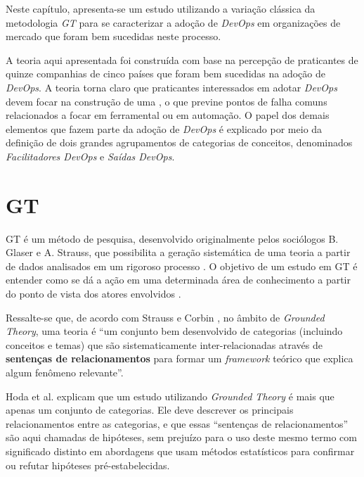 Neste capítulo, apresenta-se um estudo utilizando a variação clássica da
metodologia \textit{\acrfull{GT}} \cite{glaser1967discovery} para se
caracterizar a adoção de \textit{DevOps} em organizações de mercado que foram bem
sucedidas neste processo.

A teoria aqui apresentada foi construída com base na percepção de
praticantes de quinze companhias de cinco países que foram bem sucedidas na
adoção de \textit{DevOps}. A teoria torna claro que praticantes interessados em
adotar \textit{DevOps} devem focar na construção de uma , o que previne pontos de falha comuns relacionados a focar em
ferramental ou em automação. O papel dos demais elementos que fazem parte da
adoção de \textit{DevOps} é explicado por meio da definição de dois grandes
agrupamentos de categorias de conceitos, denominados \emph{Facilitadores DevOps}
e \emph{Saídas DevOps}.

\section{\acrfull{GT}}

\acrfull{GT} é um método de pesquisa, desenvolvido originalmente pelos
sociólogos B. Glaser e A. Strauss, que possibilita a geração sistemática de
uma teoria a partir de dados analisados em um rigoroso processo \cite{glaser1967discovery}.
O objetivo de um estudo em \acrshort{GT} é entender como se dá a ação em uma
determinada área de conhecimento a partir do ponto de vista dos atores
envolvidos \cite{glaser_doing_1998}.

Ressalte-se que, de acordo com Strauss e Corbin \cite{corbin2014basics}, no
âmbito de \textit{Grounded Theory}, uma teoria é ``um conjunto bem desenvolvido
de categorias (incluindo conceitos e temas) que são sistematicamente
inter-relacionadas através de \textbf{sentenças de relacionamentos} para
formar um \textit{framework} teórico que explica algum fenômeno relevante''.

Hoda et al. \cite{hoda2017becoming} explicam que um estudo utilizando
\textit{Grounded Theory} é mais que apenas um conjunto de categorias. Ele deve
descrever os principais relacionamentos entre as categorias, e que essas
``sentenças de relacionamentos'' são aqui chamadas de hipóteses, sem prejuízo
para o uso deste mesmo termo com significado distinto em abordagens que usam
métodos estatísticos para confirmar ou refutar hipóteses pré-estabelecidas.


